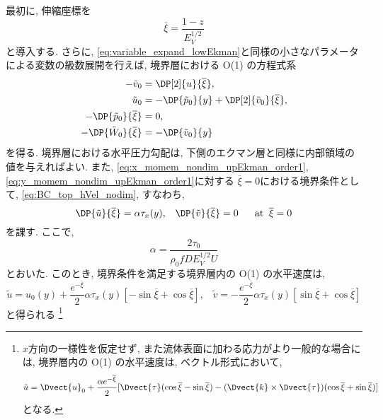 最初に, 伸縮座標を
\begin{equation}
 \overline{\xi} = \dfrac{1 - z}{E_V^{1/2}}
\end{equation}
と導入する. 
さらに, \eqref{eq:variable_expand_lowEkman}と同様の小さなパラメータによる変数の級数展開を行えば, 
境界層における O(1) の方程式系
\begin{subequations}
\begin{align}
   - \tilde{v}_0 &= \DP[2]{u}{\overline{\xi}}, 
       \label{eq:x_momem_nondim_upEkman_order1} \\
   \tilde{u}_0    &= - \DP{\tilde{p}_0}{y} + \DP[2]{\tilde{v}_0}{\overline{\xi}}, 
       \label{eq:y_momem_nondim_upEkman_order1} \\
  - \DP{\tilde{p}_0}{\overline{\xi}} &= 0, 
        \label{eq:hydrostatic_nondim_upEkman_order1} \\
  - \DP{\tilde{W}_0}{\overline{\xi}} &= - \DP{\tilde{v}_0}{y} 
        \label{eq:continuity_nondim_uperEkman_order1}
\end{align}
\end{subequations}
を得る. 
境界層における水平圧力勾配は, 下側のエクマン層と同様に内部領域の値を与えればよい. 
また, \eqref{eq:x_momem_nondim_upEkman_order1}, \eqref{eq:y_momem_nondim_upEkman_order1}に対する
$\overline{\xi}=0$における境界条件として, 
\eqref{eq:BC_top_hVel_nodim}, すなわち,  
\begin{equation}
 \DP{\tilde{u}}{\overline{\xi}} = \alpha \tau_x (y), \;\;\;
 \DP{\tilde{v}}{\overline{\xi}} = 0 \;\;\;\;\;\; {\rm at} \;\; \overline{\xi} = 0
\end{equation}
を課す. 
ここで, 
\begin{equation}
 \alpha = \dfrac{2\tau_0}{\rho_0 f D E_V^{1/2} U}
\end{equation}
とおいた. 
このとき, 境界条件を満足する境界層内の O(1) の水平速度は, 
\begin{equation}
\boxed{
  \tilde{u} = u_0(y) + \dfrac{e^{-\overline{\xi}}}{2} \alpha \tau_x(y) \left[ - \sin{\overline{\xi}} + \cos{\overline{\xi}} \right], \;\;\;
  \tilde{v} = - \dfrac{e^{-\overline{\xi}}}{2} \alpha \tau_x(y) \left[ \sin{\overline{\xi}} + \cos{\overline{\xi}} \right]
}
\label{eq:upEkmanSol_vVel_order1}
\end{equation}
と得られる%
\footnote{
$x$方向の一様性を仮定せず, また流体表面に加わる応力がより一般的な場合には, 
境界層内の O(1) の水平速度は, 
ベクトル形式において, 
\begin{equation}
 \tilde{u} = \Dvect{u}_0 + \dfrac{\alpha e^{-\overline{\xi}}}{2} 
      [\Dvect{\tau}(\cos{\overline{\xi}} - \sin{\overline{\xi}}) - (\Dvect{k}\times\Dvect{\tau})(\cos{\overline{\xi}} + \sin{\overline{\xi}})]
\label{eq:upEkmanSol_hVel_order1}
\end{equation}
となる. 
}

